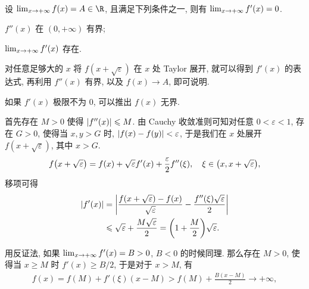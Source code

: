 \begin{exercise}[series=exer]
\begin{align*}
  \end{align*}
  \item 设 $ \limit{x}{+\infty} f(x) = A \in \R $, 且满足下列条件之一, 则有 $ \lim_{x \to +\infty} f'(x) = 0 $.
  \begin{exercise}
      \item $ f''(x) $ 在 $ (0, +\infty) $ 有界;
      \item $ \lim_{x \to +\infty} f'(x) $ 存在.
  \end{exercise}
  \begin{hint}
      \begin{hintsheet}
          \item 对任意足够大的 $ x $ 将 $ f(x+\sqrt{\varepsilon}) $ 在 $ x $ 处 Taylor 展开, 就可以得到 $ f'(x) $ 的表达式, 再利用 $ f''(x) $ 有界, 以及 $ f(x) \to A $, 即可说明.
          \item 如果 $ f'(x) $ 极限不为 $ 0 $, 可以推出 $ f(x) $ 无界.
      \end{hintsheet}
  \end{hint}
  \begin{answer}
      \begin{answersheet}
          \item 首先存在 $ M > 0 $ 使得 $ \abs{f''(x)} \leqslant M $. 由 Cauchy 收敛准则可知对任意 $ 0 < \varepsilon < 1 $, 存在 $ G > 0 $, 使得当 $ x, y > G $ 时, $ \abs{f(x) - f(y)} < \varepsilon $, 于是我们在 $ x $ 处展开 $ f(x + \sqrt{\varepsilon}) $, 其中 $ x > G $.
          \begin{align*}
              f\qty(x + \sqrt{\varepsilon}) = f(x) + \sqrt{\varepsilon}f'(x) + \frac{\varepsilon}{2}f''(\xi),\quad \xi \in \qty(x, x + \sqrt{\varepsilon}),
          \end{align*}
          移项可得
          \begin{align*}
              \abs{f'(x)} & = \abs{\frac{f\qty(x + \sqrt{\varepsilon}) - f(x)}{\sqrt{\varepsilon}} - \frac{f''(\xi)\sqrt{\varepsilon}}{2}}\\
              & \leqslant \sqrt{\varepsilon} + \frac{M\sqrt{\varepsilon}}{2} = \qty(1 + \frac{M}{2})\sqrt{\varepsilon}.
          \end{align*}
          \item 用反证法, 如果 $ \lim_{x \to +\infty} f'(x) = B > 0 $, $ B < 0 $ 的时候同理. 那么存在 $ M > 0 $, 使得当 $ x \ge M $ 时 $ f'(x) \ge B/2 $, 于是对于 $ x > M $, 有
          \begin{align*}
              f(x) = f(M) + f'(\xi)(x - M) > f(M) + \frac{B(x - M)}{2} \to +\infty,
          \end{align*}

\end{answersheet}
\end{answer}
\end{exercise}
